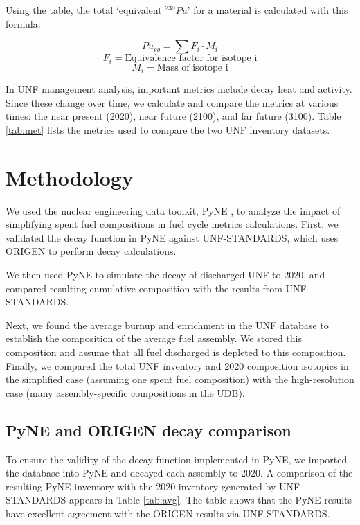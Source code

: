 \documentclass{anstrans}
\begin{document}
Using the table, the total `equivalent $^{239}Pu$' for a material is
calculated with this formula:

\[ Pu_{eq} = \sum{F_i \cdot M_i} \]
\[ F_i = \text{Equivalence factor for isotope i}\]
\[ M_i = \text{Mass of isotope i} \]

In \gls{UNF} management analysis, important metrics include
decay heat and activity. Since these
change over time, we calculate and compare the metrics
at various times: the near present (2020), near future (2100), and far future (3100).
Table \ref{tab:met} lists the metrics used to compare the 
two \gls{UNF} inventory datasets.

\section{Methodology}
We used the nuclear engineering data toolkit, \gls{PyNE} \cite{scopatz_pyne_2012},
to analyze the impact of simplifying spent fuel compositions in fuel cycle 
metrics calculations. First, 
we validated the decay function in \gls{PyNE} against \gls{UNF-STANDARDS}, 
which uses ORIGEN \cite{bell_origen:_1973} to perform decay calculations.

We then used \gls{PyNE} to simulate the decay of
discharged \gls{UNF} to 2020, and compared resulting cumulative composition 
with the results from \gls{UNF-STANDARDS}.

Next, we found the average
burnup and enrichment in the \gls{UNF} database to establish 
the composition of the average fuel assembly.
We stored this composition and assume that all fuel
discharged is depleted to this composition. Finally, we
compared the total \gls{UNF} inventory and 2020 composition 
isotopics in the simplified case (assuming one spent fuel 
composition) with the high-resolution case (many assembly-specific 
compositions in the \gls{UDB}).

\subsection{PyNE and ORIGEN decay comparison}
To ensure the validity of the decay function implemented in \gls{PyNE}, 
we imported the database into \gls{PyNE} and decayed each assembly
to 2020. A comparison of the resulting \gls{PyNE} inventory with the 2020 inventory generated by \gls{UNF-STANDARDS} appears in Table \ref{tab:avg}. 
The table shows that the \gls{PyNE} results have excellent
agreement with the ORIGEN results via \gls{UNF-STANDARDS}.
\end{document}
